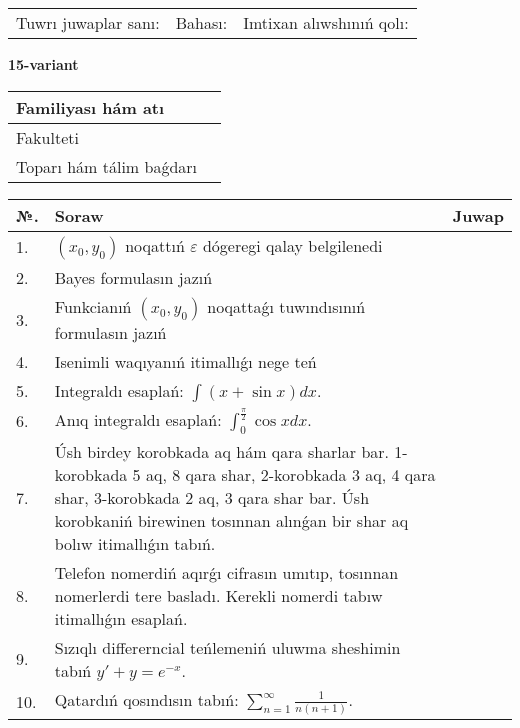 \documentclass{article}
\begin{document}
\vspace{1cm}

\begin{tabular}{ c c c }
Tuwrı juwaplar sanı: \underline{\hspace{2cm}} & Bahası: \underline{\hspace{2cm}} & Imtixan alıwshınıń qolı: \underline{\hspace{2cm}} \\
\end{tabular}

\newpage

\begin{center}\textbf{15-variant}\end{center}

\bgroup
\def\arraystretch{1.5}
\begin{tabular}{ |m{6cm}|m{10cm}| }
  \hline
  Familiyası hám atı & \\
  \hline
  Fakulteti &\\
  \hline
  Toparı hám tálim baǵdarı & \\
  \hline
\end{tabular}
\egroup

\vspace{0.5cm}

\bgroup
\def\arraystretch{2}
\begin{tabular}{ |l|m{8cm}|m{7cm}| }
  \hline
  №. & Soraw & Juwap \\
  \hline
  1. & $(x_{0} , y_{0})$ noqattıń $\varepsilon$ dógeregi qalay belgilenedi &  \\
  \hline
  2. & Bayes formulasın jazıń &  \\
  \hline
  3. & Funkcianıń $(x_{0}, y_{0})$ noqattaǵı tuwındısınıń formulasın jazıń &  \\
  \hline
  4. & Isenimli waqıyanıń itimallıǵı nege teń &  \\
  \hline
  5. & Integraldı esaplań: $\displaystyle\int (x + \sin x)dx$. &  \\
  \hline
  6. & Anıq integraldı esaplań: $\displaystyle\int_{0}^{\frac{\pi}{2}}\cos xdx$. &  \\
  \hline
  7. & Úsh birdey korobkada aq hám qara sharlar bar. 1-korobkada 5 aq, 8 qara shar, 2-korobkada 3 aq, 4 qara shar, 3-korobkada 2 aq, 3 qara shar bar. Úsh korobkaniń birewinen tosınnan alınǵan bir shar aq bolıw itimallıǵın tabıń. &  \\
  \hline
  8. & Telefon nomerdiń aqırǵı cifrasın umıtıp, tosınnan nomerlerdi tere basladı. Kerekli nomerdi tabıw itimallıǵın esaplań. &  \\
  \hline
  9. & Sızıqlı differerncial teńlemeniń uluwma sheshimin tabıń $y' + y =e^{-x}$. &  \\
  \hline
  10. & Qatardıń qosındısın tabıń: $\displaystyle\sum_{n = 1}^{\infty}\frac{1}{n(n + 1)}$. &  \\
  \hline
\end{tabular}
\egroup
\end{document}
